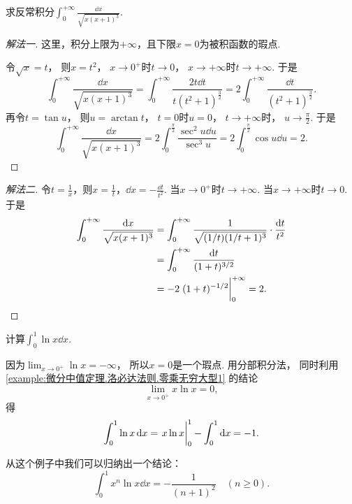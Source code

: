 \begin{example}
求反常积分\(\int_0^{+\infty} \frac{\dd{x}}{\sqrt{x(x+1)^3}}\).
\begin{solution}\let\qed\relax
\begin{proof}[解法一]
这里，积分上限为\(+\infty\)，且下限\(x=0\)为被积函数的瑕点.

令\(\sqrt{x} = t\)，
则\(x = t^2\)，
\(x\to0^+\)时\(t\to0\)，
\(x\to+\infty\)时\(t\to+\infty\).
于是\begin{equation*}
	\int_0^{+\infty} \frac{\dd{x}}{\sqrt{x(x+1)^3}}
	= \int_0^{+\infty} \frac{2t\dd{t}}{t(t^2+1)^{\frac32}}
	= 2 \int_0^{+\infty} \frac{\dd{t}}{(t^2+1)^{\frac32}}.
\end{equation*}
再令\(t = \tan u\)，
则\(u = \arctan t\)，
\(t=0\)时\(u=0\)，
\(t\to+\infty\)时，
\(u\to\frac\pi2\).
于是\begin{equation*}
	\int_0^{+\infty} \frac{\dd{x}}{\sqrt{x(x+1)^3}}
	= 2 \int_0^{\frac\pi2} \frac{\sec^2 u \dd{u}}{\sec^3 u}
	= 2 \int_0^{\frac\pi2} \cos u \dd{u}
	= 2.
\end{equation*}
\end{proof}
\begin{proof}[解法二]
令\(t = \frac1x\)，则\(x=\frac1t\)，\(\dd{x} = -\frac{\dd{t}}{t^2}\).
当\(x\to0^+\)时\(t\to+\infty\).
当\(x\to+\infty\)时\(t\to0\).
于是\begin{align*}
	\int_0^{+\infty} \frac{\dd{x}}{\sqrt{x(x+1)^3}}
	&= \int_0^{+\infty} \frac1{\sqrt{(1/t)(1/t+1)^3}} \cdot \frac{\dd{t}}{t^2} \\
	&= \int_0^{+\infty} \frac{\dd{t}}{(1+t)^{3/2}} \\
	&= -2 \eval{(1+t)^{-1/2}}_0^{+\infty}
	= 2.
\end{align*}
\end{proof}
\end{solution}
\end{example}

\begin{example}
计算\(\int_0^1 \ln x \dd{x}\).
\begin{solution}
因为\(\lim_{x\to0^+} \ln x = -\infty\)，
所以\(x=0\)是一个瑕点.
用分部积分法，
同时利用\cref{example:微分中值定理.洛必达法则.零乘无穷大型1} 的结论\begin{equation*}
	\lim_{x\to0^+} x \ln x = 0,
\end{equation*}
得\begin{equation*}
	\int_0^1 \ln x \dd{x}
	= \eval{x \ln x}_0^1
	- \int_0^1 \dd{x}
	= -1.
\end{equation*}
\end{solution}
\end{example}
\begin{remark}
从这个例子中我们可以归纳出一个结论：\begin{equation}
	\int_0^1 x^n \ln x \dd{x}
	= -\frac1{(n+1)^2}
	\quad(n\geq0).
\end{equation}
\end{remark}

